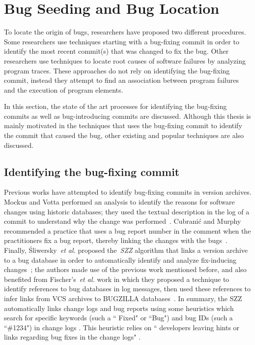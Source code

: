 \documentclass[a4paper, 12pt]{book}
\begin{document}
\section{Bug Seeding and Bug Location}
\label{subsec:bugSeedingBG}

To locate the origin of bugs, researchers have proposed two different procedures. Some researchers use techniques starting with a bug-fixing commit in order to identify the most recent commit(s) that was changed to fix the bug. Other researchers use techniques to locate root causes of software failures by analyzing program traces. These approaches do not rely on identifying the bug-fixing commit, instead they attempt to find an association between program failures and the execution of program elements.

In this section, the state of the art processes for identifying the bug-fixing commits as well as bug-introducing commits are discussed. Although this thesis is mainly motivated in the techniques that uses the bug-fixing commit to identify the commit that caused the bug, other existing and popular techniques are also discussed.

\subsection{Identifying the bug-fixing commit}

Previous works have attempted to identify bug-fixing commits in version archives. Mockus and Votta performed an analysis to identify the reasons for software changes using historic databases; they used the textual description in the log of a commit to understand why the change was performed~\cite{mockus2000identifying}. Cubrani\'c and Murphy recommended a practice that uses a bug report number in the comment when the practitioners fix a bug report, thereby linking the changes with the bugs~\cite{vcubranic2003hipikat}. Finally, \'Sliwersky~\emph{et al.} proposed the~\emph{SZZ} algorithm that links a version archive to a bug database in order to automatically identify and analyze fix-inducing changes~\cite{sliwerski2005changes}; the authors made use of the previous work mentioned before, and also benefited from Fischer's~\emph{et al.} work in which they proposed a technique to identify references to bug databases in log messages, then used these references to infer links from VCS archives to BUGZILLA databases~\cite{fischer2003analyzing,fischer2003populating}. In summary, the SZZ automatically links change logs and bug reports using some heuristics which search for specific keywords (such a `` Fixed" or ``Bug") and bug IDs (such a ``\#1234") in change logs \cite{bachmann2009software,mockus2000identifying,schroter2006if,zimmermann2007predicting}. This heuristic relies on `` developers leaving hints or links regarding bug fixes in the change logs"\cite{wu2011relink} . 
\end{document}
